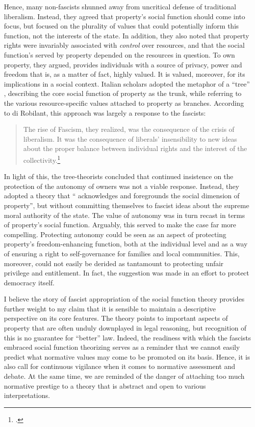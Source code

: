 Hence, many non-fascists shunned away from uncritical defense of traditional liberalism. Instead, they agreed that property's social function should come into focus, but focused on the plurality of values that could potentially inform this function, not the interests of the state. In addition, they also noted that property rights were invariably associated with {\it control} over resources, and that the social function's served by property depended on the resources in question. To own property, they argued, provides individuals with a source of privacy, power and freedom that is, as a matter of fact, highly valued. It is valued, moreover, for its implications in a social context. Italian scholars adopted the metaphor of a ``tree'' , describing the core social function of property as the trunk, while referring to the various resource-specific values attached to property as branches. According to di Robilant, this approach was largely a response to the fascists:

\begin{quote}
The rise of Fascism, they realized, was the
consequence of the crisis of liberalism. It was the consequence of liberals' insensibility to new ideas about the proper balance between individual rights and the interest of the collectivity.\footcite[907]{robilant13}
\end{quote}

In light of this, the tree-theorists concluded that continued insistence on the protection of the autonomy of owners was not a viable response. Instead, they adopted a theory that `` acknowledges and foregrounds the social dimension of property'', but without committing themselves to fascist ideas about the supreme moral authority of the state. The value of autonomy was in turn recast in terms of property's social function. Arguably, this served to make the case far more compelling. Protecting autonomy could be seen as an aspect of protecting property's freedom-enhancing function, both at the individual level and as a way of ensuring a right to self-governance for families and local communities. This, moreover, could not easily be derided as tantamount to protecting unfair privilege and entitlement. In fact, the suggestion was made in an effort to protect democracy itself.

I believe the story of fascist appropriation of the social function theory provides further weight to my claim that it is sensible to  maintain a descriptive perspective on its core features. The theory points to important aspects of property that are often unduly downplayed in legal reasoning, but recognition of this is no guarantee for ``better'' law. Indeed, the readiness with which the fascists embraced social function theorizing serves as a reminder that we cannot easily predict what normative values may come to be promoted on its basis. Hence, it is also call for continuous vigilance when it comes to normative assessment and debate. At the same time, we are reminded of the danger of attaching too much normative prestige to a theory that is abstract and open to various interpretations.

